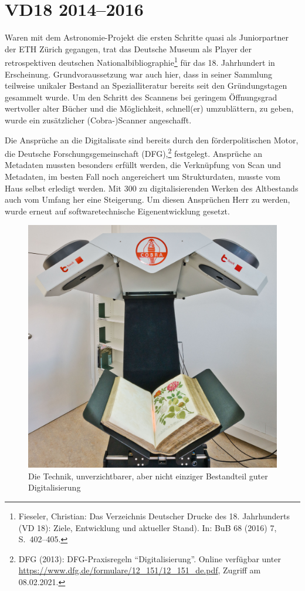 \documentclass[a4paper,
fontsize=11pt,
oneside,
numbers=noperiodatend,
parskip=half-,
bibliography=totoc,
final
]{scrartcl}
\begin{document}
\hypertarget{vd18-20142016}{%
\section{VD18 2014--2016}\label{vd18-20142016}}

Waren mit dem Astronomie-Projekt die ersten Schritte quasi als
Juniorpartner der ETH Zürich gegangen, trat das Deutsche Museum als
Player der retrospektiven deutschen Nationalbibliographie\footnote{Fieseler,
  Christian: Das Verzeichnis Deutscher Drucke des 18. Jahrhunderts (VD
  18): Ziele, Entwicklung und aktueller Stand). In: BuB 68 (2016) 7,
  S.~402--405.} für das 18. Jahrhundert in Erscheinung.
Grundvoraussetzung war auch hier, dass in seiner Sammlung teilweise
unikaler Bestand an Spezialliteratur bereits seit den Gründungstagen
gesammelt wurde. Um den Schritt des Scannens bei geringem Öffnungsgrad
wertvoller alter Bücher und die Möglichkeit, schnell(er) umzublättern,
zu geben, wurde ein zusätzlicher (Cobra-)Scanner angeschafft.

Die Ansprüche an die Digitalisate sind bereits durch den
förderpolitischen Motor, die Deutsche Forschungsgemeinschaft
(DFG),\footnote{DFG (2013): DFG-Praxisregeln \enquote{Digitalisierung}.
  Online verfügbar unter
  \url{https://www.dfg.de/formulare/12\_151/12\_151\_de.pdf}, Zugriff am
  08.02.2021.} festgelegt. Ansprüche an Metadaten mussten besonders
erfüllt werden, die Verknüpfung von Scan und Metadaten, im besten Fall
noch angereichert um Strukturdaten, musste vom Haus selbst erledigt
werden. Mit 300 zu digitalisierenden Werken des Altbestands auch vom
Umfang her eine Steigerung. Um diesen Ansprüchen Herr zu werden, wurde
erneut auf softwaretechnische Eigenentwicklung gesetzt.

\begin{figure}
\centering
\includegraphics[width=.6\textwidth]{img/Abb5.jpg}
\caption{Die Technik, unverzichtbarer, aber nicht einziger Bestandteil
guter Digitalisierung}
\end{figure}
\end{document}
